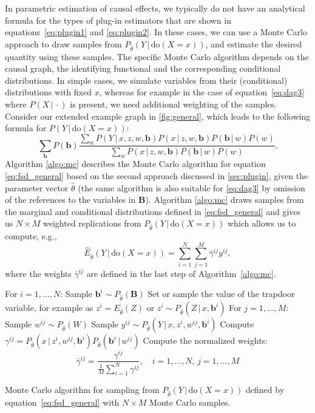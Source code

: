 \documentclass[11pt,a4paper,twoside]{article}
\newcommand{\+}[1]{\ensuremath{\mathbf{#1}}}
\newcommand{\doo}{\textrm{do}}
\newcommand{\given}{{ \, | \, }}
\newcommand{\z}{trapdoor variable}
\begin{document}
	In parametric estimation of causal effects, we typically do not have an analytical formula for the types of plug-in estimators that are shown in equations~\eqref{eq:plugin1} and \eqref{eq:plugin2}. In these cases, we can use a Monte Carlo approach to draw samples from $P_{\hat \theta}(Y \given \doo(X = x))$, and estimate the desired quantity using these samples. The specific Monte Carlo algorithm depends on the causal graph, the identifying functional and the corresponding conditional distributions. In simple cases, we simulate variables from their (conditional) distributions with fixed $x$, whereas for example in the case of equation~\eqref{eq:dag3} where $P(X \given \cdot)$ is present, we need additional weighting of the samples. Consider our extended example graph in \autoref{fig:general}, which leads to the following formula for $P(Y \given \doo(X = x))$:
		\begin{equation}
	\label{eq:fsd_general}
	 \sum_{\+b} P(\+b)\frac{\sum_{w} P(Y \given x, z, w, \+b)P(x \given z,w,\+b)P(\+b \given w)P(w)}{\sum_{w} P(x \given z,w,\+b)P(\+b\given w)P(w)}.
	\end{equation}
	Algorithm \ref{algo:mc} describes the Monte Carlo algorithm for equation \eqref{eq:fsd_general} based on the second approach discussed in \autoref{sec:plugin}, given the parameter vector $\hat \theta$ (the same algorithm is also suitable for \eqref{eq:dag3} by omission of the references to the variables in $\+ B$). Algorithm \ref{algo:mc} draws samples from the marginal and conditional distributions defined in \eqref{eq:fsd_general} and gives us $N \times M$ weighted replications from $P_{\hat \theta}(Y \given \doo(X = x))$ which allows us to compute, e.g.,
\begin{equation}\label{eq:mc-mean}
\widehat E_{\hat \theta}(Y \given \doo(X = x)) = \sum_{i=1}^{N}\sum_{j=1}^{M} \bar \gamma^{ij} y^{ij},
\end{equation}
where the weights $\bar \gamma^{ij}$ are defined in the last step of Algorithm~\ref{algo:mc}. 

\begin{algorithm}[!t]
	\begin{algorithmic}[1]
		\State For $i = 1,\ldots,N$:
		\State \quad Sample $\+b^i \sim P_{\hat \theta}(\+B)$
		\State \quad Set or sample the value of the \z, for example as $z^i = E_{\hat \theta}(Z)$ or $z^i \sim P_{\hat \theta}(Z \given  x, \+b^i)$
		\State \quad For $j = 1, \ldots, M$:
		\State \quad \quad Sample $w^{ij} \sim P_{\hat \theta}(W)$
		\State \quad \quad Sample $y^{ij} \sim P_{\hat \theta}(Y \given  x, z^i, w^{ij}, \+b^i)$
		\State \quad \quad Compute $\gamma^{ij} =  P_{\hat \theta}(x \given z^i, w^{ij}, \+b^i) P_{\hat \theta}(\+b^i \given  w^{ij})$
		\State Compute the normalized weights:
		\[
		\bar \gamma^{ij} = \frac{\gamma^{ij}}{\frac{1}{M}\sum_{i=1}^N \gamma^{ij}}, \quad i = 1, \ldots, N,\, j = 1, \ldots, M
		\]
	\end{algorithmic}
	\caption{Monte Carlo algorithm for sampling from $P_{\hat \theta}(Y \given \doo(X = x))$ defined by equation~\eqref{eq:fsd_general} with $N \times M$ Monte Carlo samples.}
	\label{algo:mc}
\end{algorithm}
\end{document}
